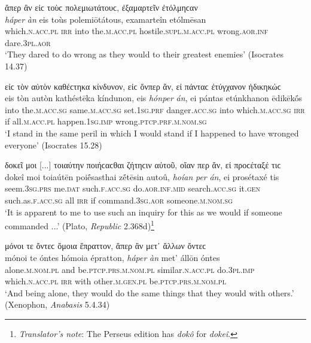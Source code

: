 \begin{exe}
\ex ἅπερ ἂν εἰϲ τοὺϲ πολεμιωτάτουϲ, ἐξαμαρτεῖν ἐτόλμηϲαν\\
\gll \emph{háper} \emph{àn} eis toùs polemiōtátous, examarteîn etólmēsan\\
which.\textsc{n.acc.pl} \textsc{irr} into the.\textsc{m.acc.pl} hostile.\textsc{supl.m.acc.pl} wrong.\textsc{aor.inf} dare.\textsc{3pl.aor}\\
\trans `They dared to do wrong as they would to their greatest enemies' (Isocrates 14.37)
\label{relan66}
\end{exe}

\begin{exe}
\ex εἰϲ τὸν αὐτὸν καθέϲτηκα κίνδυνον, εἰϲ ὅνπερ ἄν, εἰ πάνταϲ ἐτύγχανον ἠδικηκώϲ\\
\gll eis tòn autòn kathéstēka kíndunon, eis \emph{hónper} \emph{án}, ei pántas etúnkhanon ēdikēkṓs\\
into the.\textsc{m.acc.sg} same.\textsc{m.acc.sg} set.\textsc{1sg.prf} danger.\textsc{acc.sg} into which.\textsc{m.acc.sg} \textsc{irr} if all.\textsc{m.acc.pl} happen.\textsc{1sg.imp} wrong.\textsc{ptcp.prf.m.nom.sg}\\
\trans `I stand in the same peril in which I would stand if I happened to have wronged everyone' (Isocrates 15.28)
\label{relan67}
\end{exe}

\begin{exe}
\ex δοκεῖ μοι {[}...{]} τοιαύτην ποιήϲαϲθαι ζήτηϲιν αὐτοῦ, οἵαν περ ἄν, εἰ προϲέταξέ τιϲ\\
\gll dokeî moi toiaútēn poiḗsasthai zḗtēsin autoû, \emph{hoían} \emph{per} \emph{án}, ei prosétaxé tis\\
seem.\textsc{3sg.prs} me.\textsc{dat} such.\textsc{f.acc.sg} do.\textsc{aor.inf.mid} search.\textsc{acc.sg} it.\textsc{gen} such.as.\textsc{f.acc.sg} all \textsc{irr} if command.\textsc{3sg.aor} someone.\textsc{m.nom.sg}\\
\trans `It is apparent to me to use such an inquiry for this as we would if someone commanded ...' (Plato, \textit{Republic} 2.368d)\footnote{\emph{Translator's note}: The Perseus edition has \textit{dokô} for \textit{dokeî}.}
\label{relan68}
\end{exe}

\begin{exe}
\ex μόνοι τε ὄντεϲ ὅμοια ἔπραττον, ἅπερ ἂν μετ᾽ ἄλλων ὄντεϲ\\
\gll mónoi te óntes hómoia épratton, \emph{háper} \emph{àn} met' állōn óntes\\
alone.\textsc{m.nom.pl} and be.\textsc{ptcp.prs.m.nom.pl} similar.\textsc{n.acc.pl} do.\textsc{3pl.imp} which.\textsc{n.acc.pl} \textsc{irr} with other.\textsc{m.gen.pl} be.\textsc{ptcp.prs.m.nom.pl}\\
\trans `And being alone, they would do the same things that they would with others.' (Xenophon, \textit{Anabasis} 5.4.34)
\label{relan69}
\end{exe}

